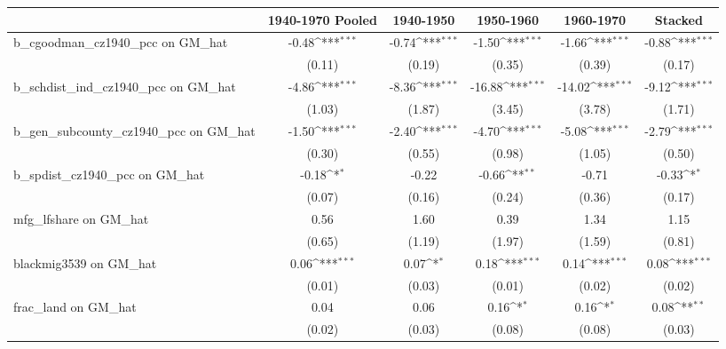 {
\def\sym#1{\ifmmode^{#1}\else\(^{#1}\)\fi}
\begin{tabular}{l*{5}{c}}
\toprule
                &\multicolumn{1}{c}{1940-1970 Pooled}&\multicolumn{1}{c}{1940-1950}&\multicolumn{1}{c}{1950-1960}&\multicolumn{1}{c}{1960-1970}&\multicolumn{1}{c}{Stacked}\\
\midrule
b\_cgoodman\_cz1940\_pcc on GM\_hat&    -0.48\sym{***}&    -0.74\sym{***}&    -1.50\sym{***}&    -1.66\sym{***}&    -0.88\sym{***}\\
                &   (0.11)         &   (0.19)         &   (0.35)         &   (0.39)         &   (0.17)         \\
\addlinespace
b\_schdist\_ind\_cz1940\_pcc on GM\_hat&    -4.86\sym{***}&    -8.36\sym{***}&   -16.88\sym{***}&   -14.02\sym{***}&    -9.12\sym{***}\\
                &   (1.03)         &   (1.87)         &   (3.45)         &   (3.78)         &   (1.71)         \\
\addlinespace
b\_gen\_subcounty\_cz1940\_pcc on GM\_hat&    -1.50\sym{***}&    -2.40\sym{***}&    -4.70\sym{***}&    -5.08\sym{***}&    -2.79\sym{***}\\
                &   (0.30)         &   (0.55)         &   (0.98)         &   (1.05)         &   (0.50)         \\
\addlinespace
b\_spdist\_cz1940\_pcc on GM\_hat&    -0.18\sym{*}  &    -0.22         &    -0.66\sym{**} &    -0.71         &    -0.33\sym{*}  \\
                &   (0.07)         &   (0.16)         &   (0.24)         &   (0.36)         &   (0.17)         \\
\addlinespace
mfg\_lfshare on GM\_hat&     0.56         &     1.60         &     0.39         &     1.34         &     1.15         \\
                &   (0.65)         &   (1.19)         &   (1.97)         &   (1.59)         &   (0.81)         \\
\addlinespace
blackmig3539 on GM\_hat&     0.06\sym{***}&     0.07\sym{*}  &     0.18\sym{***}&     0.14\sym{***}&     0.08\sym{***}\\
                &   (0.01)         &   (0.03)         &   (0.01)         &   (0.02)         &   (0.02)         \\
\addlinespace
frac\_land on GM\_hat&     0.04         &     0.06         &     0.16\sym{*}  &     0.16\sym{*}  &     0.08\sym{**} \\
                &   (0.02)         &   (0.03)         &   (0.08)         &   (0.08)         &   (0.03)         \\

\end{tabular}}

